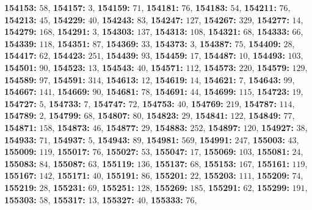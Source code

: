 \textsf{\bfseries 154153:} $58$, \textsf{\bfseries 154157:} $3$, \textsf{\bfseries 154159:} $71$, \textsf{\bfseries 154181:} $76$, \textsf{\bfseries 154183:} $54$, \textsf{\bfseries 154211:} $76$, \textsf{\bfseries 154213:} $45$, \textsf{\bfseries 154229:} $40$, \textsf{\bfseries 154243:} $83$, \textsf{\bfseries 154247:} $127$, \textsf{\bfseries 154267:} $329$, \textsf{\bfseries 154277:} $14$, \textsf{\bfseries 154279:} $168$, \textsf{\bfseries 154291:} $3$, \textsf{\bfseries 154303:} $137$, \textsf{\bfseries 154313:} $108$, \textsf{\bfseries 154321:} $68$, \textsf{\bfseries 154333:} $66$, \textsf{\bfseries 154339:} $118$, \textsf{\bfseries 154351:} $87$, \textsf{\bfseries 154369:} $33$, \textsf{\bfseries 154373:} $3$, \textsf{\bfseries 154387:} $75$, \textsf{\bfseries 154409:} $28$, \textsf{\bfseries 154417:} $62$, \textsf{\bfseries 154423:} $251$, \textsf{\bfseries 154439:} $93$, \textsf{\bfseries 154459:} $17$, \textsf{\bfseries 154487:} $10$, \textsf{\bfseries 154493:} $103$, \textsf{\bfseries 154501:} $90$, \textsf{\bfseries 154523:} $13$, \textsf{\bfseries 154543:} $40$, \textsf{\bfseries 154571:} $112$, \textsf{\bfseries 154573:} $220$, \textsf{\bfseries 154579:} $129$, \textsf{\bfseries 154589:} $97$, \textsf{\bfseries 154591:} $314$, \textsf{\bfseries 154613:} $12$, \textsf{\bfseries 154619:} $14$, \textsf{\bfseries 154621:} $7$, \textsf{\bfseries 154643:} $99$, \textsf{\bfseries 154667:} $141$, \textsf{\bfseries 154669:} $90$, \textsf{\bfseries 154681:} $78$, \textsf{\bfseries 154691:} $44$, \textsf{\bfseries 154699:} $115$, \textsf{\bfseries 154723:} $19$, \textsf{\bfseries 154727:} $5$, \textsf{\bfseries 154733:} $7$, \textsf{\bfseries 154747:} $72$, \textsf{\bfseries 154753:} $40$, \textsf{\bfseries 154769:} $219$, \textsf{\bfseries 154787:} $114$, \textsf{\bfseries 154789:} $2$, \textsf{\bfseries 154799:} $68$, \textsf{\bfseries 154807:} $80$, \textsf{\bfseries 154823:} $29$, \textsf{\bfseries 154841:} $122$, \textsf{\bfseries 154849:} $77$, \textsf{\bfseries 154871:} $158$, \textsf{\bfseries 154873:} $46$, \textsf{\bfseries 154877:} $29$, \textsf{\bfseries 154883:} $252$, \textsf{\bfseries 154897:} $120$, \textsf{\bfseries 154927:} $38$, \textsf{\bfseries 154933:} $71$, \textsf{\bfseries 154937:} $5$, \textsf{\bfseries 154943:} $89$, \textsf{\bfseries 154981:} $569$, \textsf{\bfseries 154991:} $247$, \textsf{\bfseries 155003:} $43$, \textsf{\bfseries 155009:} $119$, \textsf{\bfseries 155017:} $76$, \textsf{\bfseries 155027:} $53$, \textsf{\bfseries 155047:} $17$, \textsf{\bfseries 155069:} $103$, \textsf{\bfseries 155081:} $24$, \textsf{\bfseries 155083:} $84$, \textsf{\bfseries 155087:} $63$, \textsf{\bfseries 155119:} $136$, \textsf{\bfseries 155137:} $68$, \textsf{\bfseries 155153:} $167$, \textsf{\bfseries 155161:} $119$, \textsf{\bfseries 155167:} $142$, \textsf{\bfseries 155171:} $40$, \textsf{\bfseries 155191:} $86$, \textsf{\bfseries 155201:} $22$, \textsf{\bfseries 155203:} $111$, \textsf{\bfseries 155209:} $74$, \textsf{\bfseries 155219:} $28$, \textsf{\bfseries 155231:} $69$, \textsf{\bfseries 155251:} $128$, \textsf{\bfseries 155269:} $185$, \textsf{\bfseries 155291:} $62$, \textsf{\bfseries 155299:} $191$, \textsf{\bfseries 155303:} $58$, \textsf{\bfseries 155317:} $13$, \textsf{\bfseries 155327:} $40$, \textsf{\bfseries 155333:} $76$, 
